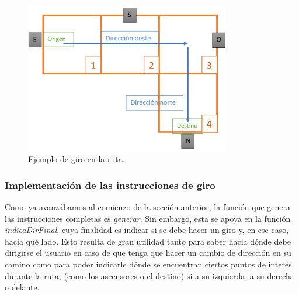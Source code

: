 \begin{figure}[t]
	\centering
	\includegraphics[width=0.8\textwidth]{Imagenes/Capitulo4/simulacion_giro}
	\caption{Ejemplo de giro en la ruta.}
	\label{fig:simulacion_giro}
\end{figure}


\subsubsection{Implementación de las instrucciones de giro}
\label{sub:instr_giro}

Como ya avanzábamos al comienzo de la sección anterior, la función que genera las instrucciones completas es \textit{generar}. Sin embargo, esta se apoya en la función \textit{indicaDirFinal}, cuya finalidad es indicar si se debe hacer un giro y, en ese caso, hacia qué lado. Esto resulta de gran utilidad tanto para saber hacia dónde debe dirigirse el usuario en caso de que tenga que hacer un cambio de dirección en su camino como para poder indicarle dónde se encuentran ciertos puntos de interés durante la ruta, (como los ascensores o el destino) si a su izquierda, a su derecha o delante.

